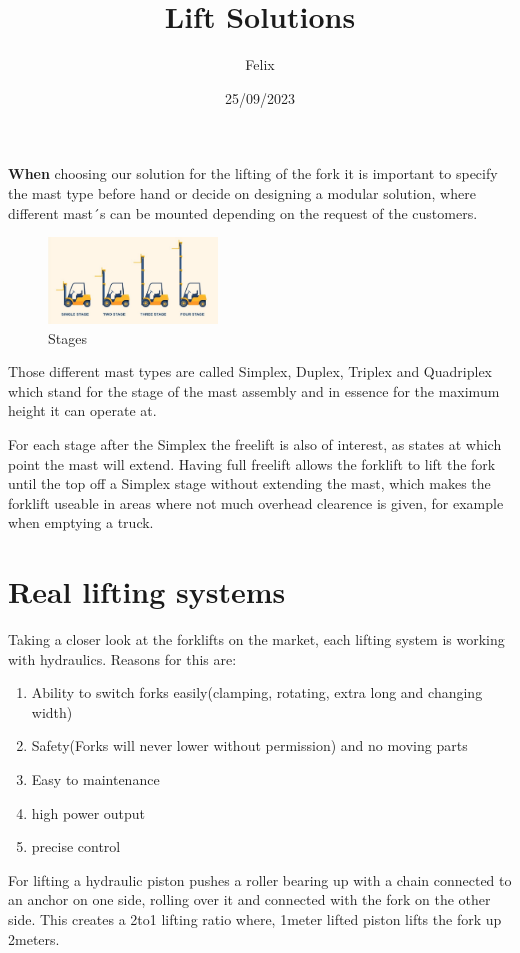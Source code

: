 \documentclass[11pt]{article}
\title{Lift Solutions}
\date{25/09/2023}
\author{Felix}
\begin{document}
\maketitle
\textbf{When} choosing our solution for the lifting of the fork it is important to specify the mast type
before hand or decide on designing a modular solution, where different mast´s can be mounted 
depending on the request of the customers. 

\begin{figure}
    \begin{center}
        \includegraphics[width=0.40\textwidth]{../image/types-of-forklift-masts-1.jpg}
        \caption{Stages}
    \end{center}
\end{figure}
Those different mast types are called Simplex, Duplex, Triplex and Quadriplex which stand for the stage of
the mast assembly and in essence for the maximum height it can operate at.

For each stage after the Simplex the freelift is also of interest, as states at which point the mast 
will extend. Having full freelift allows the forklift to lift the fork until the top off a Simplex stage
without extending the mast, which makes the forklift useable in areas where not much overhead clearence is given,
for example when emptying a truck. 

\section{Real lifting systems}
Taking a closer look at the forklifts on the market, each lifting system is working with hydraulics. 
Reasons for this are:
\begin{enumerate}
    \item Ability to switch forks easily(clamping, rotating, extra long and changing width)
    \item Safety(Forks will never lower without permission) and no moving parts 
    \item Easy to maintenance 
    \item high power output
    \item precise control
\end{enumerate}
For lifting a hydraulic piston pushes a roller bearing up with a chain connected to an anchor on one side, rolling over 
it and connected with the fork on the other side. This creates a 2to1 lifting ratio where, 1meter lifted piston lifts the 
fork up 2meters.
\end{document}
